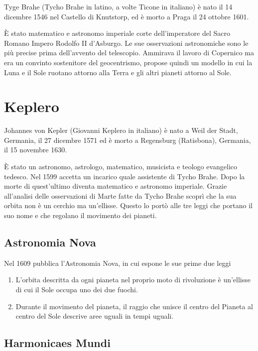 \documentclass[a4paper]{scrartcl}
\begin{document}
Tyge Brahe (Tycho Brahe in latino, a volte Ticone in italiano) è nato il 14 dicembre 1546 nel Castello di Knutstorp,  ed è morto a Praga  il 24 ottobre 1601.

È stato matematico e astronomo imperiale corte dell'imperatore del Sacro Romano Impero Rodolfo II d'Asburgo. Le sue osservazioni astronomiche sono le più precise prima dell'avvento del telescopio.
Ammirava il lavoro di Copernico ma era un convinto sostenitore del geocentrismo, propose quindi un modello in cui la Luna e il Sole ruotano attorno alla Terra e gli altri pianeti attorno al Sole.


\section{Keplero}

Johannes von Kepler (Giovanni Keplero in italiano) è nato a Weil der Stadt, Germania, il 27 dicembre 1571 ed è morto a Regensburg (Ratisbona), Germania, il 15 novembre 1630.

È stato un astronomo, astrologo, matematico, musicista e teologo evangelico tedesco. Nel 1599 accetta un incarico quale assistente di Tycho Brahe. Dopo la morte di quest'ultimo diventa matematico e astronomo imperiale. Grazie all'analisi delle osservazioni di Marte fatte da Tycho Brahe scoprì che la sua orbita non è un cerchio ma un'ellisse. Questo lo portò alle tre leggi che portano il suo nome e che regolano il movimento dei pianeti.

\subsection{Astronomia Nova}

Nel 1609 pubblica l'Astronomia Nova, in cui espone le sue prime due leggi

\begin{enumerate}
	\item L'orbita descritta da ogni pianeta nel proprio moto di rivoluzione è un'ellisse di cui il Sole occupa uno dei due fuochi.
	\item Durante il movimento del pianeta, il raggio che unisce il centro del Pianeta al centro del Sole descrive aree uguali in tempi uguali.
\end{enumerate}

\subsection{Harmonicaes Mundi}
\end{document}
